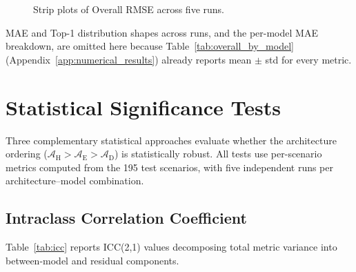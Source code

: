 \documentclass[final,3p,times]{elsarticle}
\begin{document}
\begin{figure}[t]
\begin{minipage}{0.24\textwidth}
\end{minipage}
\hfill
\begin{minipage}{0.24\textwidth}
\centering
{}
\end{minipage}
\caption{Strip plots of Overall RMSE across five runs.}
\label{fig:violin_rmse}
\end{figure}

MAE and Top-1 distribution shapes across runs, and the per-model MAE breakdown, are omitted here because Table~\ref{tab:overall_by_model} (Appendix~\ref{app:numerical_results}) already reports mean $\pm$ std for every metric.

\section{Statistical Significance Tests}
\label{app:significance}

Three complementary statistical approaches evaluate whether the architecture ordering ($\mathcal{A}_{\text{H}} > \mathcal{A}_{\text{E}} > \mathcal{A}_{\text{D}}$) is statistically robust. All tests use per-scenario metrics computed from the 195 test scenarios, with five independent runs per architecture--model combination.

\subsection{Intraclass Correlation Coefficient}

Table~\ref{tab:icc} reports ICC(2,1) values decomposing total metric variance into between-model and residual components.
\end{document}
